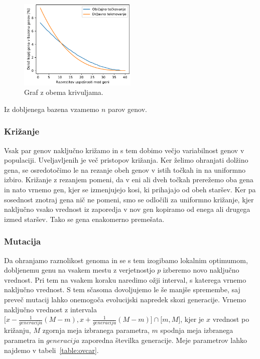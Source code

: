 \begin{figure}[ht]  %
	\centering
	\includegraphics[width=0.5\textwidth]{../poglavja/images/parjenje.pdf}
	\caption[Verjetnost parjenja]{Graf z obema krivuljama.} %
	\label{fig:verjetnost-parjenja}
\end{figure}

Iz dobljenega bazena vzamemo $n$ parov genov.

\subsubsection{Križanje}

Vsak par genov naključno križamo in s tem dobimo večjo variabilnost genov v populaciji. Uveljavljenih je več pristopov križanja. Ker želimo ohranjati dolžino gena, se osredotočimo le na rezanje obeh genov v istih točkah in na uniformno izbiro. Križanje z rezanjem pomeni, da v eni ali dveh točkah prerežemo oba gena in nato vrnemo gen, kjer se izmenjujejo kosi, ki prihajajo od obeh staršev. Ker pa sosednost znotraj gena nič ne pomeni, smo se odločili za uniformno križanje, kjer naključno vsako vrednost iz zaporedja v nov gen kopiramo od enega ali drugega izmed staršev. Tako se gena enakomerno premešata.

\subsubsection{Mutacija}

Da ohranjamo raznolikost genoma in se s tem izogibamo lokalnim optimumom, dobljenemu genu na vsakem mestu z verjetnostjo $p$ izberemo novo naključno vrednost. Pri tem na vsakem koraku naredimo ožji interval, s katerega vrnemo naključno vrednost. S tem sčasoma dovoljujemo le še manjše spremembe, saj preveč mutacij lahko onemogoča evolucijski napredek skozi generacije. Vrnemo naključno vrednost z intervala $\lbrack x - \frac{1}{generacija} (M - m), x + \frac{1}{generacija} (M - m)\rbrack \cap \lbrack m, M \rbrack$, kjer je $x$ vrednost po križanju, $M$ zgornja meja izbranega parametra, $m$ spodnja meja izbranega parametra in $generacija$ zaporedna številka generacije. Meje parametrov lahko najdemo v tabeli~\ref{table:ovcar}.

